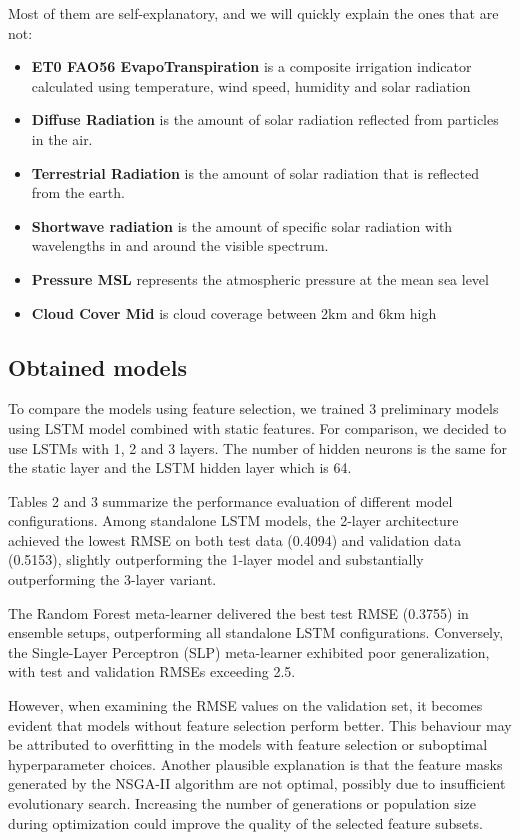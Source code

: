 \documentclass[12pt]{article}
\begin{document}
Most of them are self-explanatory, and we will quickly explain the ones that are not:
\begin{itemize}
  \item \textbf{ET0 FAO56 EvapoTranspiration} is a composite irrigation indicator calculated using temperature, wind speed, humidity and solar radiation
  \item \textbf{Diffuse Radiation} is the amount of solar radiation reflected from particles in the air.
  \item \textbf{Terrestrial Radiation} is the amount of solar radiation that is reflected from the earth.
  \item \textbf{Shortwave radiation} is the amount of specific solar radiation with wavelengths in and around the visible spectrum.
  \item \textbf{Pressure MSL} represents the atmospheric pressure at the mean sea level
  \item \textbf{Cloud Cover Mid} is cloud coverage between 2km and 6km high
\end{itemize}

\subsection{Obtained models}

To compare the models using feature selection, we trained 3 preliminary models using LSTM model combined with static features. For comparison, we decided to use LSTMs with 1, 2 and 3 layers. The number of hidden neurons is the same for the static layer and the LSTM hidden layer which is 64.

Tables 2 and 3 summarize the performance evaluation of different model configurations. Among standalone LSTM models, the 2-layer architecture achieved the lowest RMSE on both test data (0.4094) and validation data (0.5153), slightly outperforming the 1-layer model and substantially outperforming the 3-layer variant.

The Random Forest meta-learner delivered the best test RMSE (0.3755) in ensemble setups, outperforming all standalone LSTM configurations. Conversely, the Single-Layer Perceptron (SLP) meta-learner exhibited poor generalization, with test and validation RMSEs exceeding 2.5.

However, when examining the RMSE values on the validation set, it becomes evident that models without feature selection perform better. This behaviour may be attributed to overfitting in the models with feature selection or suboptimal hyperparameter choices. Another plausible explanation is that the feature masks generated by the NSGA-II algorithm are not optimal, possibly due to insufficient evolutionary search. Increasing the number of generations or population size during optimization could improve the quality of the selected feature subsets.
\end{document}
